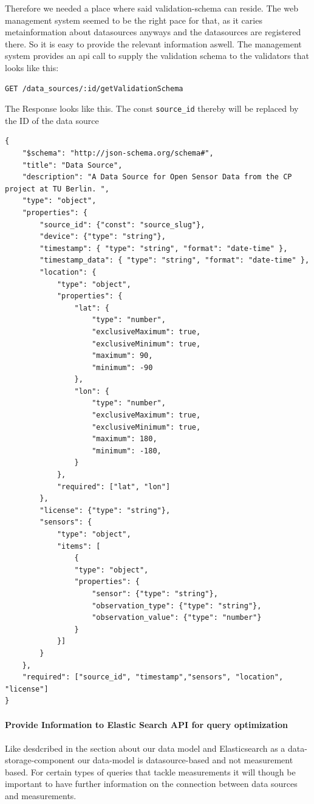 Therefore we needed a place where said validation-schema can reside. The
web management system seemed to be the right pace for that, as it caries
metainformation about datasources anyways and the datasources are
registered there. So it is easy to provide the relevant information
aswell. The management system provides an api call to supply the
validation schema to the validators that looks like this:

\begin{verbatim}
GET /data_sources/:id/getValidationSchema
\end{verbatim}

The Response looks like this. The const \texttt{source\_id} thereby will
be replaced by the ID of the data source

\begin{verbatim}
{
	"$schema": "http://json-schema.org/schema#",
	"title": "Data Source",
	"description": "A Data Source for Open Sensor Data from the CP project at TU Berlin. ",
	"type": "object",
	"properties": {
		"source_id": {"const": "source_slug"},
		"device": {"type": "string"},
		"timestamp": { "type": "string", "format": "date-time" },
		"timestamp_data": { "type": "string", "format": "date-time" },
		"location": {
			"type": "object",
			"properties": {
				"lat": {
					"type": "number",
					"exclusiveMaximum": true,
					"exclusiveMinimum": true,
					"maximum": 90,
					"minimum": -90
				},
				"lon": {
					"type": "number",
					"exclusiveMaximum": true,
					"exclusiveMinimum": true,
					"maximum": 180,
					"minimum": -180,
				}
			},
			"required": ["lat", "lon"]
		},
		"license": {"type": "string"},
		"sensors": {
			"type": "object",
			"items": [
				{
				"type": "object",
				"properties": {
					"sensor": {"type": "string"},
					"observation_type": {"type": "string"},
					"observation_value": {"type": "number"}
				}
			}]
		}
	},
	"required": ["source_id", "timestamp","sensors", "location", "license"]
}
\end{verbatim}

\paragraph{Provide Information to Elastic Search API for query
	optimization}\label{provide-information-to-elastic-search-api-for-query-optimization}

\paragraph{}
Like desdcribed in the section about our data model and Elasticsearch as
a data-storage-component our data-model is datasource-based and not
measurement based. For certain types of queries that tackle measurements
it will though be important to have further information on the
connection between data sources and measurements.

